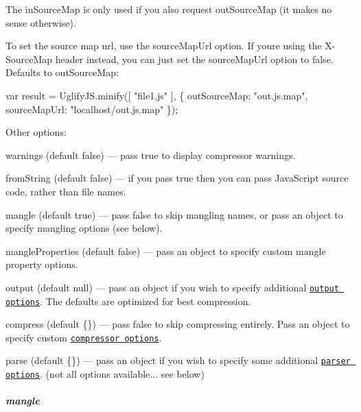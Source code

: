 The {\ttfamily in\+Source\+Map} is only used if you also request {\ttfamily out\+Source\+Map} (it makes no sense otherwise).

To set the source map url, use the {\ttfamily source\+Map\+Url} option. If you\textquotesingle{}re using the X-\/\+Source\+Map header instead, you can just set the {\ttfamily source\+Map\+Url} option to false. Defaults to out\+Source\+Map\+:


\begin{DoxyCode}
var result = UglifyJS.minify([ "file1.js" ], \{
  outSourceMap: "out.js.map",
  sourceMapUrl: "localhost/out.js.map"
\});
\end{DoxyCode}


Other options\+:


\begin{DoxyItemize}
\item {\ttfamily warnings} (default {\ttfamily false}) — pass {\ttfamily true} to display compressor warnings.
\item {\ttfamily from\+String} (default {\ttfamily false}) — if you pass {\ttfamily true} then you can pass Java\+Script source code, rather than file names.
\item {\ttfamily mangle} (default {\ttfamily true}) — pass {\ttfamily false} to skip mangling names, or pass an object to specify mangling options (see below).
\item {\ttfamily mangle\+Properties} (default {\ttfamily false}) — pass an object to specify custom mangle property options.
\item {\ttfamily output} (default {\ttfamily null}) — pass an object if you wish to specify additional \href{http://lisperator.net/uglifyjs/codegen}{\tt output options}. The defaults are optimized for best compression.
\item {\ttfamily compress} (default {\ttfamily \{\}}) — pass {\ttfamily false} to skip compressing entirely. Pass an object to specify custom \href{http://lisperator.net/uglifyjs/compress}{\tt compressor options}.
\item {\ttfamily parse} (default \{\}) — pass an object if you wish to specify some additional \href{http://lisperator.net/uglifyjs/parser}{\tt parser options}. (not all options available... see below)
\end{DoxyItemize}

\subparagraph*{mangle}


